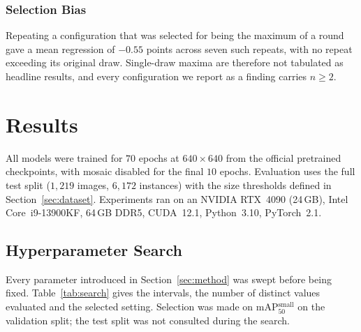\documentclass[10pt,twocolumn,a4paper]{article}
\begin{document}
\subsubsection{Selection Bias} Repeating a configuration that was selected for
being the maximum of a round gave a mean regression of $-0.55$ points across
seven such repeats, with no repeat exceeding its original draw. Single-draw
maxima are therefore not tabulated as headline results, and every configuration
we report as a finding carries $n \ge 2$.

\section{Results}
\label{sec:results}

All models were trained for $70$ epochs at $640\times640$ from the official
pretrained checkpoints, with mosaic disabled for the final $10$ epochs.
Evaluation uses the full test split ($1{,}219$ images, $6{,}172$ instances) with
the size thresholds defined in Section~\ref{sec:dataset}. Experiments ran on an
NVIDIA RTX~4090 (24\,GB), Intel Core~i9-13900KF, 64\,GB DDR5, CUDA~12.1,
Python~3.10, PyTorch~2.1.

\subsection{Hyperparameter Search}
\label{sec:results:search}

Every parameter introduced in Section~\ref{sec:method} was swept before being
fixed. Table~\ref{tab:search} gives the intervals, the number of distinct values
evaluated and the selected setting. Selection was made on
mAP$_{50}^{\text{small}}$ on the validation split; the test split was not
consulted during the search.
\end{document}
